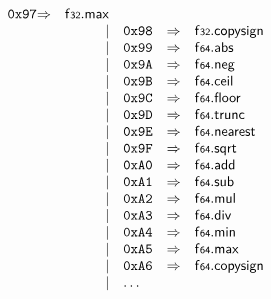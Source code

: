 $$\begin{array}{@{}l@{}rrlll@{}l@{}}
\mathtt{0x97} &\Rightarrow& \mathsf{f{\scriptstyle32}} . \mathsf{max} \\ &&|&
\mathtt{0x98} &\Rightarrow& \mathsf{f{\scriptstyle32}} . \mathsf{copysign} \\ &&|&
\mathtt{0x99} &\Rightarrow& \mathsf{f{\scriptstyle64}} . \mathsf{abs} \\ &&|&
\mathtt{0x9A} &\Rightarrow& \mathsf{f{\scriptstyle64}} . \mathsf{neg} \\ &&|&
\mathtt{0x9B} &\Rightarrow& \mathsf{f{\scriptstyle64}} . \mathsf{ceil} \\ &&|&
\mathtt{0x9C} &\Rightarrow& \mathsf{f{\scriptstyle64}} . \mathsf{floor} \\ &&|&
\mathtt{0x9D} &\Rightarrow& \mathsf{f{\scriptstyle64}} . \mathsf{trunc} \\ &&|&
\mathtt{0x9E} &\Rightarrow& \mathsf{f{\scriptstyle64}} . \mathsf{nearest} \\ &&|&
\mathtt{0x9F} &\Rightarrow& \mathsf{f{\scriptstyle64}} . \mathsf{sqrt} \\ &&|&
\mathtt{0xA0} &\Rightarrow& \mathsf{f{\scriptstyle64}} . \mathsf{add} \\ &&|&
\mathtt{0xA1} &\Rightarrow& \mathsf{f{\scriptstyle64}} . \mathsf{sub} \\ &&|&
\mathtt{0xA2} &\Rightarrow& \mathsf{f{\scriptstyle64}} . \mathsf{mul} \\ &&|&
\mathtt{0xA3} &\Rightarrow& \mathsf{f{\scriptstyle64}} . \mathsf{div} \\ &&|&
\mathtt{0xA4} &\Rightarrow& \mathsf{f{\scriptstyle64}} . \mathsf{min} \\ &&|&
\mathtt{0xA5} &\Rightarrow& \mathsf{f{\scriptstyle64}} . \mathsf{max} \\ &&|&
\mathtt{0xA6} &\Rightarrow& \mathsf{f{\scriptstyle64}} . \mathsf{copysign} \\ &&|&
\dots \\
\end{array}
$$

\vspace{1ex}

